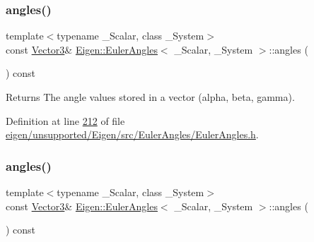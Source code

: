 \subsubsection{\texorpdfstring{angles()}{angles()}\hspace{0.1cm}{\footnotesize\ttfamily [1/4]}}
{\footnotesize\ttfamily template$<$typename \+\_\+\+Scalar, class \+\_\+\+System$>$ \\
const \hyperlink{class_eigen_1_1_euler_angles_af0f446aa0f46b3439abedff63fabf39c}{Vector3}\& \hyperlink{class_eigen_1_1_euler_angles}{Eigen\+::\+Euler\+Angles}$<$ \+\_\+\+Scalar, \+\_\+\+System $>$\+::angles (\begin{DoxyParamCaption}{ }\end{DoxyParamCaption}) const\hspace{0.3cm}{\ttfamily [inline]}}

\begin{DoxyReturn}{Returns}
The angle values stored in a vector (alpha, beta, gamma). 
\end{DoxyReturn}


Definition at line \hyperlink{eigen_2unsupported_2_eigen_2src_2_euler_angles_2_euler_angles_8h_source_l00212}{212} of file \hyperlink{eigen_2unsupported_2_eigen_2src_2_euler_angles_2_euler_angles_8h_source}{eigen/unsupported/\+Eigen/src/\+Euler\+Angles/\+Euler\+Angles.\+h}.

\mbox{\label{class_eigen_1_1_euler_angles_a2decf84b5efd265f7251fd32f539a36b}} 
\subsubsection{\texorpdfstring{angles()}{angles()}\hspace{0.1cm}{\footnotesize\ttfamily [2/4]}}
{\footnotesize\ttfamily template$<$typename \+\_\+\+Scalar, class \+\_\+\+System$>$ \\
const \hyperlink{class_eigen_1_1_euler_angles_af0f446aa0f46b3439abedff63fabf39c}{Vector3}\& \hyperlink{class_eigen_1_1_euler_angles}{Eigen\+::\+Euler\+Angles}$<$ \+\_\+\+Scalar, \+\_\+\+System $>$\+::angles (\begin{DoxyParamCaption}{ }\end{DoxyParamCaption}) const\hspace{0.3cm}{\ttfamily [inline]}}

